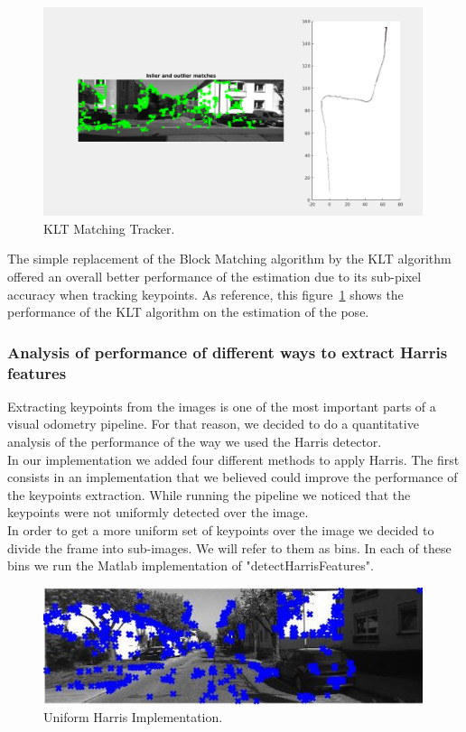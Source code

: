 \begin{figure}
  \includegraphics[width=0.99\textwidth]{files/klt_tracker.png}
  \caption[KLT Matching Tracker]{\label{f:klt_tracker}KLT Matching Tracker.}
\end{figure}


The simple replacement of the Block Matching algorithm by the KLT algorithm offered an overall better performance of the estimation due to its sub-pixel accuracy when tracking keypoints. As reference, this figure~\ref{f:klt_tracker} shows the performance of the KLT algorithm on the estimation of the pose.

\subsubsection{Analysis of performance of different ways to extract Harris features}

Extracting keypoints from the images is one of the most important parts of a visual odometry pipeline. For that reason, we
decided to do a quantitative analysis of the performance of the way we used the Harris detector. \\
In our implementation we added four different methods to apply Harris.
The first consists in an implementation that we believed could improve the performance of the keypoints extraction.
While running the pipeline we noticed that the keypoints were not uniformly detected over the image. \\
In order to get a more uniform set of keypoints over the image we decided to divide the frame into sub-images. We will refer to them
as bins. In each of these bins we run the Matlab implementation of "detectHarrisFeatures".

\begin{figure}
  \includegraphics[width=0.99\textwidth]{files/custom_uniform_keypoints.jpg}
  \caption[\label{f:custom_uniform}Uniform Harris Implementation]{Uniform Harris Implementation.}
\end{figure}

